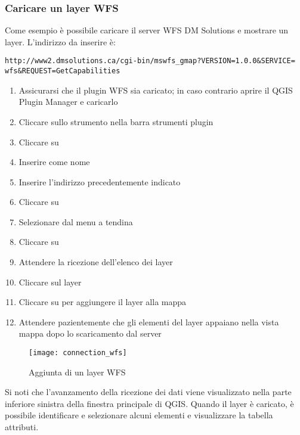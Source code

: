 \subsubsection{Caricare un layer WFS}

Come esempio è possibile caricare il server WFS DM Solutions e mostrare un
layer. L'indirizzo da inserire è:
\begin{verbatim}
http://www2.dmsolutions.ca/cgi-bin/mswfs_gmap?VERSION=1.0.0&SERVICE=
wfs&REQUEST=GetCapabilities
\end{verbatim}

\begin{enumerate}
  \item Assicurarsi che il plugin WFS sia caricato; in caso contrario aprire
  il QGIS Plugin Manager e caricarlo
  \item Cliccare sullo strumento  nella barra strumenti plugin
  \item Cliccare su  
  \item Inserire  come nome
  \item Inserire l'indirizzo precedentemente indicato
  \item Cliccare su  
  \item Selezionare  dal menu a
  tendina
  \item Cliccare su  
  \item Attendere la ricezione dell'elenco dei layer
  \item Cliccare sul layer 
  \item Cliccare su  per aggiungere il layer alla mappa
  \item Attendere pazientemente che gli elementi del layer appaiano nella
  vista mappa dopo lo scaricamento dal server
\end{enumerate}

\begin{figure}[ht]
  \begin{center}
  	\caption{Aggiunta di un layer WFS \nixcaption}\label{fig:wfs_dmsolutions}
	\texttt{[image: connection\_wfs]}
  \end{center}
\end{figure}

Si noti che l'avanzamento della ricezione dei dati viene visualizzato nella
parte inferiore sinistra della finestra principale di QGIS. 
Quando il layer è caricato, è possibile identificare e selezionare alcuni
elementi e visualizzare la tabella attributi.

